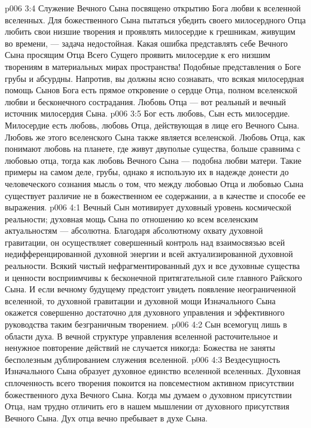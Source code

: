 \vs p006 3:4 Служение Вечного Сына посвящено открытию Бога любви к вселенной вселенных. Для божественного Сына пытаться убедить своего милосердного Отца любить свои низшие творения и проявлять милосердие к грешникам, живущим во времени, --- задача недостойная. Какая ошибка представлять себе Вечного Сына просящим Отца Всего Сущего проявить милосердие к его низшим творениям в материальных мирах пространства! Подобные представления о Боге грубы и абсурдны. Напротив, вы должны ясно сознавать, что всякая милосердная помощь Сынов Бога есть прямое откровение о сердце Отца, полном вселенской любви и бесконечного сострадания. Любовь Отца --- вот реальный и вечный источник милосердия Сына.
\vs p006 3:5 Бог есть любовь, Сын есть милосердие. Милосердие есть любовь, любовь Отца, действующая в лице его Вечного Сына. Любовь же этого вселенского Сына также является вселенской. Любовь Отца, как понимают любовь на планете, где живут двуполые существа, больше сравнима с любовью отца, тогда как любовь Вечного Сына --- подобна любви матери. Такие примеры на самом деле, грубы, однако я использую их в надежде донести до человеческого сознания мысль о том, что между любовью Отца и любовью Сына существует различие не в божественном ее содержании, а в качестве и способе ее выражения.
\vs p006 4:1 Вечный Сын мотивирует духовный уровень космической реальности; духовная мощь Сына по отношению ко всем вселенским актуальностям --- абсолютна. Благодаря абсолютному охвату духовной гравитации, он осуществляет совершенный контроль над взаимосвязью всей недифференцированной духовной энергии и всей актуализированной духовной реальности. Всякий чистый нефрагментированный дух и все духовные существа и ценности восприимчивы к бесконечной притягательной силе главного Райского Сына. И если вечному будущему предстоит увидеть появление неограниченной вселенной, то духовной гравитации и духовной мощи Изначального Сына окажется совершенно достаточно для духовного управления и эффективного руководства таким безграничным творением.
\vs p006 4:2 \pc Сын всемогущ лишь в области духа. В вечной структуре управления вселенной расточительное и ненужное повторение действий не случается никогда: Божества не заняты бесполезным дублированием служения вселенной.
\vs p006 4:3 \pc Вездесущность Изначального Сына образует духовное единство вселенной вселенных. Духовная сплоченность всего творения покоится на повсеместном активном присутствии божественного духа Вечного Сына. Когда мы думаем о духовном присутствии Отца, нам трудно отличить его в нашем мышлении от духовного присутствия Вечного Сына. Дух отца вечно пребывает в духе Сына.
